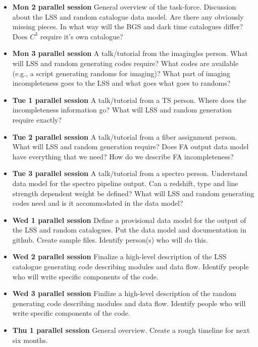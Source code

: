 \documentclass[11pt]{article}
\begin{document}
\begin{itemize}
\item \textbf{Mon 2 parallel session} General overview of the task-force.
Discussion about the LSS and random catalogue data model. Are there any
obviously missing pieces. In what way will the BGS and dark time catalogues
differ? Does $C^3$ require it's own catalogue?
\item \textbf{Mon 3 parallel session} A talk/tutorial from the imaginglss
person. What will LSS and random generating codes require? What codes are
available (e.g., a script generating randoms for imaging)? What part of imaging
incompleteness goes to the LSS and what goes what goes to randoms?
\item \textbf{Tue 1 parallel session} A talk/tutorial from a TS person. Where
does the incompleteness information go? What will LSS and random generation
require exactly?
\item \textbf{Tue 2 parallel session} A talk/tutorial from a fiber assignment
person. What will LSS and random generation require? Does FA output data model
have everything that we need? How do we describe FA incompleteness?
\item \textbf{Tue 3 parallel session} A talk/tutorial from a spectro person.
Understand data model for the spectro pipeline output. Can a redshift, type and
line strength dependent weight be defined? What will LSS and random generating
codes need and is it accommodated in the data model?
\item \textbf{Wed 1 parallel session} Define a provisional data model for the
output of the LSS and random catalogues. Put the data model and documentation in
github. Create sample files. Identify person(s) who will do this.
\item \textbf{Wed 2 parallel session} Finalize a high-level description of the
LSS catalogue generating code describing modules and data flow. Identify people
who will write specific components of the code.
\item \textbf{Wed 3 parallel session} Finilize a high-level description of the
random generating code describing modules and data flow.  Identify people who
will write specific components of the code.
\item \textbf{Thu 1 parallel session} General overview. Create a rough timeline
for next six months.
\end{itemize}
\end{document}
